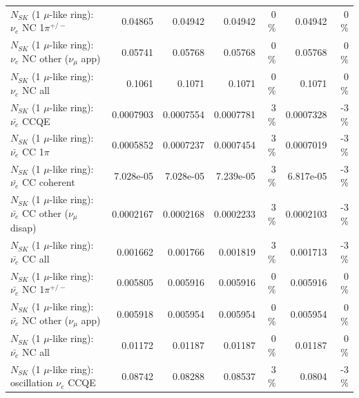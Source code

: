 \begin{table}
\begin{tabular}{| l | r | r | r  r | r  r |}
\hline
                           $N_{SK}$ (1 $\mu$-like ring): $\nu_e$ NC 1$\pi^{+/-}$ &         0.04865 &         0.04942 &         0.04942 &        0 \%  &         0.04942 &        0 \%  \\ 
                  $N_{SK}$ (1 $\mu$-like ring): $\nu_e$ NC other ($\nu_\mu$ app) &         0.05741 &         0.05768 &         0.05768 &        0 \%  &         0.05768 &        0 \%  \\ 
                                  $N_{SK}$ (1 $\mu$-like ring): $\nu_{e}$ NC all &          0.1061 &          0.1071 &          0.1071 &        0 \%  &          0.1071 &        0 \%  \\ 
\hline
\hline
\hline
                                $N_{SK}$ (1 $\mu$-like ring): $\bar{\nu_e}$ CCQE &       0.0007903 &       0.0007554 &       0.0007781 &        3 \%  &       0.0007328 &       -3 \%  \\ 
                           $N_{SK}$ (1 $\mu$-like ring): $\bar{\nu_e}$ CC 1$\pi$ &       0.0005852 &       0.0007237 &       0.0007454 &        3 \%  &       0.0007019 &       -3 \%  \\ 
                         $N_{SK}$ (1 $\mu$-like ring): $\bar{\nu_e}$ CC coherent &       7.028e-05 &       7.028e-05 &       7.239e-05 &        3 \%  &       6.817e-05 &       -3 \%  \\ 
          $N_{SK}$ (1 $\mu$-like ring): $\bar{\nu_e}$ CC other ($\nu_\mu$ disap) &       0.0002167 &       0.0002168 &       0.0002233 &        3 \%  &       0.0002103 &       -3 \%  \\ 
                            $N_{SK}$ (1 $\mu$-like ring): $\bar{\nu_{e}}$ CC all &        0.001662 &        0.001766 &        0.001819 &        3 \%  &        0.001713 &       -3 \%  \\ 
\hline
                     $N_{SK}$ (1 $\mu$-like ring): $\bar{\nu_e}$ NC 1$\pi^{+/-}$ &        0.005805 &        0.005916 &        0.005916 &        0 \%  &        0.005916 &        0 \%  \\ 
            $N_{SK}$ (1 $\mu$-like ring): $\bar{\nu_e}$ NC other ($\nu_\mu$ app) &        0.005918 &        0.005954 &        0.005954 &        0 \%  &        0.005954 &        0 \%  \\ 
                            $N_{SK}$ (1 $\mu$-like ring): $\bar{\nu_{e}}$ NC all &         0.01172 &         0.01187 &         0.01187 &        0 \%  &         0.01187 &        0 \%  \\ 
\hline
\hline
\hline
                          $N_{SK}$ (1 $\mu$-like ring): oscillation $\nu_e$ CCQE &         0.08742 &         0.08288 &         0.08537 &        3 \%  &          0.0804 &       -3 \%  \\ 

\end{tabular}
\end{table}
